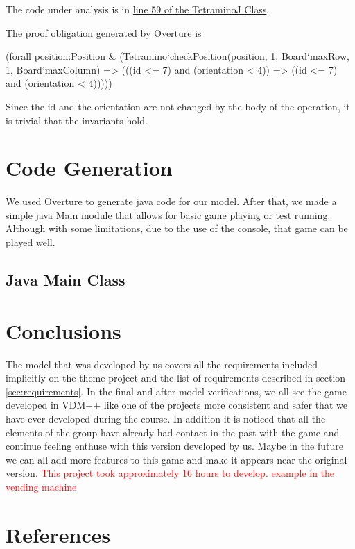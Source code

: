 \documentclass[a4paper]{article}
\begin{document}
The code under analysis is in \hyperref[getRotatedMino:55]{line 59 of the TetraminoJ Class}.

The proof obligation generated by Overture is
\begin{vdmpp}
	(forall position:Position 
		& (Tetramino`checkPosition(position, 1, Board`maxRow, 1, Board`maxColumn) 
			=> (((id <= 7) and (orientation < 4)) 
				=> ((id <= 7) and (orientation < 4)))))
\end{vdmpp}

Since the id and the orientation are not changed by the body of the operation, it is trivial that the invariants hold.

\section{Code Generation}

We used Overture to generate java code for our model. After that, we made a simple java Main module that allows for basic game playing or test running. Although with some limitations, due to the use of the console, that game can be played well.

\subsection{Java Main Class}



\section{Conclusions} 

The model that was developed by us covers all the requirements included implicitly on the theme project and the list of requirements described in section \ref{sec:requirements}.
In the final and after model verifications, we all see the game developed in VDM++ like one of the projects more consistent and safer that we have ever developed during the course. 
In addition it is noticed that all the elements of the group have already had contact in the past with the game and continue feeling enthuse with this version developed by us. Maybe in the future we can all add more features to this game and make it appears near the original version.
\textcolor{red}{This project took approximately 16 hours to develop. example in the vending machine}


\section{References}
\end{document}
